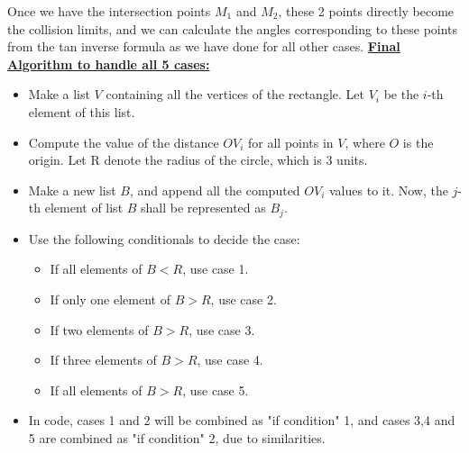 \documentclass[12pt]{article}
\begin{document}
Once we have the intersection points $M_1$ and $M_2$, these 2 points directly become the collision limits, and we can calculate the angles corresponding to these points from the tan inverse formula as we have done for all other cases.
\newline
\newline
\underline{\textbf{Final Algorithm to handle all 5 cases:}}
\newline
\begin{itemize}
    \item Make a list $V$ containing all the vertices of the rectangle. Let $V_i$ be the $i$-th element of this list.
    
    \item Compute the value of the distance $OV_i$ for all points in $V$, where $O$ is the origin. Let R denote the radius of the circle, which is 3 units.
    
    \item Make a new list $B$, and append all the computed $OV_i$ values to it. Now, the $j$-th element of list $B$ shall be represented as $B_j$.
    
    \item Use the following conditionals to decide the case:
    \begin{itemize}
        \renewcommand\labelitemi{--}
        \item If all elements of $B < R$, use case 1.
        \item If only one element of $B > R$, use case 2.
        \item If two elements of $B > R$, use case 3.
        \item If three elements of $B > R$, use case 4.
        \item If all elements of $B > R$, use case 5.
    \end{itemize}
    
    \item In code, cases 1 and 2 will be combined as "if condition" 1, and cases 3,4 and 5 are combined as "if condition" 2, due to similarities.
\end{itemize}
\clearpage
\end{document}
